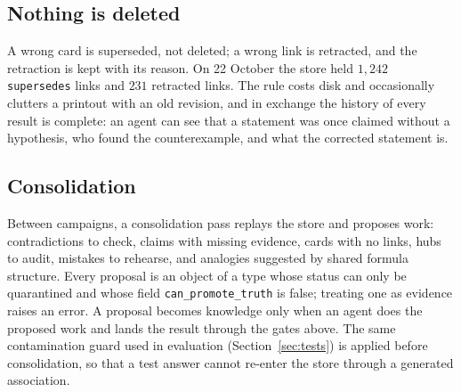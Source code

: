 \subsection{Nothing is deleted}
A wrong card is superseded, not deleted; a wrong link is retracted, and the retraction is kept with its reason. On 22 October the store held $1{,}242$ \texttt{supersedes} links and $231$ retracted links. The rule costs disk and occasionally clutters a printout with an old revision, and in exchange the history of every result is complete: an agent can see that a statement was once claimed without a hypothesis, who found the counterexample, and what the corrected statement is.

\subsection{Consolidation}
Between campaigns, a consolidation pass replays the store and proposes work: contradictions to check, claims with missing evidence, cards with no links, hubs to audit, mistakes to rehearse, and analogies suggested by shared formula structure. Every proposal is an object of a type whose status can only be \textsf{quarantined} and whose field \texttt{can\_promote\_truth} is false; treating one as evidence raises an error. A proposal becomes knowledge only when an agent does the proposed work and lands the result through the gates above. The same contamination guard used in evaluation (Section~\ref{sec:tests}) is applied before consolidation, so that a test answer cannot re-enter the store through a generated association.
